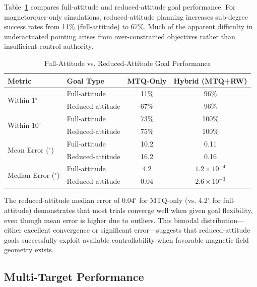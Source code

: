 \documentclass[conference]{IEEEtran}
\begin{document}
Table~\ref{tab:reduced_vs_full} compares full-attitude and reduced-attitude goal performance. For magnetorquer-only simulations, reduced-attitude planning increases sub-degree success rates from 11\% (full-attitude) to 67\%. Much of the apparent difficulty in underactuated pointing arises from over-constrained objectives rather than insufficient control authority.

\begin{table}[t]
    \centering
    \caption{Full-Attitude vs. Reduced-Attitude Goal Performance}
    \label{tab:reduced_vs_full}
    \begin{tabular}{llcc}
        \toprule
        Metric & Goal Type & MTQ-Only & Hybrid (MTQ+RW) \\
        \midrule
        \multirow{2}{*}{Within 1$^\circ$}
            & Full-attitude & 11\% & 96\% \\
            & Reduced-attitude & 67\% & 96\% \\
        \midrule
        \multirow{2}{*}{Within 10$^\circ$}
            & Full-attitude & 73\% & 100\% \\
            & Reduced-attitude & 75\% & 100\% \\
        \midrule
        \multirow{2}{*}{Mean Error ($^\circ$)}
            & Full-attitude & 10.2 & 0.11 \\
            & Reduced-attitude & 16.2 & 0.16 \\
        \midrule
        \multirow{2}{*}{Median Error ($^\circ$)}
            & Full-attitude & 4.2 & $1.2\times10^{-4}$ \\
            & Reduced-attitude & 0.04 & $2.6\times10^{-3}$ \\
        \bottomrule
    \end{tabular}
\end{table}

The reduced-attitude median error of 0.04$^\circ$ for MTQ-only (vs. 4.2$^\circ$ for full-attitude) demonstrates that most trials converge well when given goal flexibility, even though mean error is higher due to outliers. This bimodal distribution---either excellent convergence or significant error---suggests that reduced-attitude goals successfully exploit available controllability when favorable magnetic field geometry exists.

\subsection{Multi-Target Performance}\label{subsec:multi_target_results}
\end{document}
